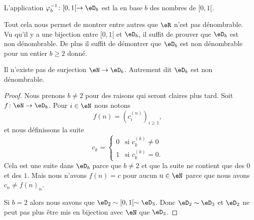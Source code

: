 L'application \( \varphi_b^{-1}\colon \mathopen[ 0 , 1 [\to \eD_b\) est la  en base \( b\) des nombres de \( \mathopen[ 0 , 1 [\).

Tout cela nous permet de montrer entre autres que \( \eR\) n'est pas dénombrable. Vu qu'il y a une bijection entre \( \mathopen[ 0 , 1 [\) et \( \eD_b\), il suffit de prouver que \( \eD_b\) est non dénombrable. De plus il suffit de démontrer que \( \eD_b\) est non dénombrable pour un entier \( b\geq 2\) donné.

\begin{proposition}  \label{PropNNHooYTVFw}
    Il n'existe pas de surjection \( \eN\to \eD_b\). Autrement dit \( \eD_b\) est non dénombrable.
\end{proposition}

\begin{proof}
    Nous prenons \( b\neq 2\) pour des raisons qui seront claires plus tard. Soit \( f\colon \eN\to \eD_b\). Pour \( i\in \eN\) nous notons
    \begin{equation}
        f(n)=(c_i^{(n)})_{i\geq 1},
    \end{equation}
    et nous définissons la suite
    \begin{equation}
        c_k=\begin{cases}
            0    &   \text{si } c_k^{(k)}\neq 0\\
            1    &    \text{si } c_k^{(k)}=0.
        \end{cases}
    \end{equation}
    Cela est une suite dans \( \eD_b\) parce que \( b\neq 2\) et que la suite ne contient que des \( 0\) et des \( 1\). Mais nous n'avons \( f(n)=c\) pour aucun \( n\in \eN\) parce que nous avons \( c_n\neq f(n)_n\).

    Si \( b=2\) alors nous savons que \( \eD_2\sim\mathopen[ 0 , 1 [\sim \eD_3\). Donc \( \eD_2\sim \eD_3\) et \( \eD_2\) ne peut pas plus être mis en bijection avec \( \eN\) que \( \eD_3\).
\end{proof}

